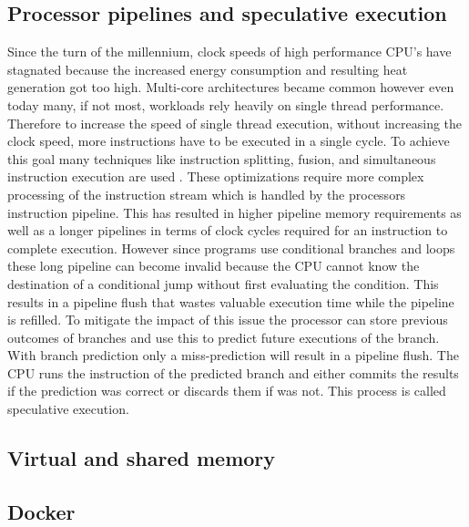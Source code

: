 \documentclass[conference,compsoc,final,a4paper]{IEEEtran}
\begin{document}
\subsection{Processor pipelines and speculative execution}
Since the turn of the millennium, clock speeds of high performance CPU's have stagnated because the increased energy consumption and resulting heat generation got
too high. \cite{fog2012microarchitecture} Multi-core architectures became common however even today many, if not most,
workloads rely heavily on single thread performance. Therefore to increase the speed of single thread execution, without increasing the clock speed,
more instructions have to be executed in a single cycle. To achieve this goal many techniques like instruction splitting, fusion,
and simultaneous instruction execution are used \cite{fog2012microarchitecture}. These optimizations require more complex processing of the instruction stream which
is handled by the processors instruction pipeline. This has resulted in higher pipeline memory requirements as well as a longer pipelines in terms of clock cycles
required for an instruction to complete execution. However since programs use conditional branches and loops these long pipeline can become invalid because the CPU
cannot know the destination of a conditional jump without first evaluating the condition. This results in a pipeline flush that wastes valuable execution time while
the pipeline is refilled. To mitigate the impact of this issue the processor can store previous outcomes of branches and use this to predict future executions of the
branch. With branch prediction only a miss-prediction will result in a pipeline flush. The CPU runs the instruction of the predicted branch and either commits
the results if the prediction was correct or discards them if was not.
This process is called speculative execution. \cite{kocher2018spectre}
\subsection{Virtual and shared memory}

\subsection{Docker}
\end{document}
